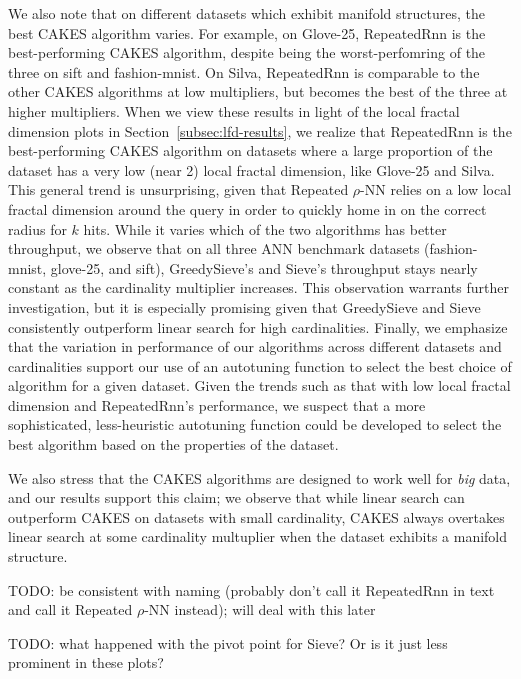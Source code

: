 We also note that on different datasets which exhibit manifold structures, the best CAKES algorithm varies. 
For example, on Glove-25, RepeatedRnn is the best-performing CAKES algorithm, despite being the worst-perfomring of the three on sift and fashion-mnist. 
On Silva, RepeatedRnn is comparable to the other CAKES algorithms at low multipliers, but becomes the best of the three at higher multipliers. 
When we view these results in light of the local fractal dimension plots in Section~\ref{subsec:lfd-results}, we realize that RepeatedRnn is the best-performing CAKES algorithm on datasets where a large proportion of the dataset has a very low (near 2) local fractal dimension, like Glove-25 and Silva. 
This general trend is unsurprising, given that Repeated $\rho$-NN relies on a low local fractal dimension around the query in order to quickly home in on the correct radius for $k$ hits. 
While it varies which of the two algorithms has better throughput, we observe that on all three ANN benchmark datasets (fashion-mnist, glove-25, and sift), GreedySieve's and Sieve's throughput stays nearly constant as the cardinality multiplier increases. 
This observation warrants further investigation, but it is especially promising given that GreedySieve and Sieve consistently outperform linear search for high cardinalities. 
Finally, we emphasize that the variation in performance of our algorithms across different datasets and cardinalities support our use of an autotuning function to select the best choice of algorithm for a given dataset. 
Given the trends such as that with low local fractal dimension and RepeatedRnn's performance, we suspect that a more sophisticated, less-heuristic autotuning function could be developed to select the best algorithm based on the properties of the dataset.

We also stress that the CAKES algorithms are designed to work well for \emph{big} data, and our results support this claim; we observe that while linear search can outperform CAKES on datasets with small cardinality, CAKES always overtakes linear search at some cardinality multuplier when the dataset exhibits a manifold structure.

{\color{red} TODO: be consistent with naming (probably don't call it RepeatedRnn in text and call it Repeated $\rho$-NN instead); will deal with this later} 


{\color{red} TODO: what happened with the pivot point for Sieve? Or is it just less prominent in these plots? }



